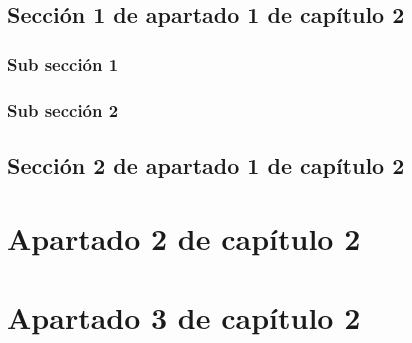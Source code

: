 \subsection{Sección 1 de apartado 1 de capítulo 2}

\subsubsection{Sub sección 1}

\subsubsection{Sub sección 2}

\subsection{Sección 2 de apartado 1 de capítulo 2}

\section{Apartado 2 de capítulo 2}

\section{Apartado 3 de capítulo 2}
